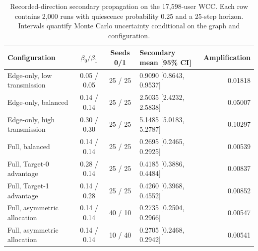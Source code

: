 \begin{table}[htbp]\centering\small
\caption{Recorded-direction secondary propagation on the 17,598-user WCC. Each row contains 2,000 runs with quiescence probability 0.25 and a 25-step horizon. Intervals quantify Monte Carlo uncertainty conditional on the graph and configuration.}\label{tab:simulation}
\begin{tabularx}{\textwidth}{@{}Xccp{3.4cm}r@{}}\toprule Configuration & $\beta_0/\beta_1$ & Seeds 0/1 & Secondary mean [95\% CI] & Amplification\\\midrule
Edge-only, low transmission & 0.05 / 0.05 & 25 / 25 & 0.9090 [0.8643, 0.9537] & 0.01818\\
Edge-only, balanced & 0.14 / 0.14 & 25 / 25 & 2.5035 [2.4232, 2.5838] & 0.05007\\
Edge-only, high transmission & 0.30 / 0.30 & 25 / 25 & 5.1485 [5.0183, 5.2787] & 0.10297\\
Full, balanced & 0.14 / 0.14 & 25 / 25 & 0.2695 [0.2465, 0.2925] & 0.00539\\
Full, Target-0 advantage & 0.28 / 0.14 & 25 / 25 & 0.4185 [0.3886, 0.4484] & 0.00837\\
Full, Target-1 advantage & 0.14 / 0.28 & 25 / 25 & 0.4260 [0.3968, 0.4552] & 0.00852\\
Full, asymmetric allocation & 0.14 / 0.14 & 40 / 10 & 0.2735 [0.2504, 0.2966] & 0.00547\\
Full, asymmetric allocation & 0.14 / 0.14 & 10 / 40 & 0.2705 [0.2468, 0.2942] & 0.00541\\
\bottomrule\end{tabularx}\end{table}
